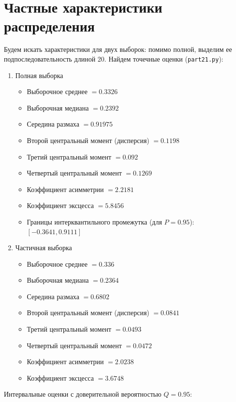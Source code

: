 \documentclass[a4paper,12pt]{article}
\begin{document}
    \section{Частные характеристики распределения}
    Будем искать характеристики для двух выборок: помимо полной, выделим
    ее подпоследовательность длиной 20. Найдем точечные оценки (\texttt{part21.py}):
    \begin{enumerate}
        \item Полная выборка
        \begin{itemize}
            \item Выборочное среднее $= 0.3326$
            \item Выборочная медиана $= 0.2392$
            \item Середина размаха $= 0.91975$
            \item Второй центральный момент (дисперсия) $= 0.1198$
            \item Третий центральный момент $= 0.092$
            \item Четвертый центральный момент $= 0.1269$
            \item Коэффициент асимметрии $=2.2181$
            \item Коэффициент эксцесса $= 5.8456$
            \item Границы интерквантильного промежутка (для $P = 0.95$): $[-0.3641, 0.9111]$
        \end{itemize}
        \item Частичная выборка
        \begin{itemize}
            \item Выборочное среднее $= 0.336$
            \item Выборочная медиана $= 0.2364$
            \item Середина размаха $= 0.6802$
            \item Второй центральный момент (дисперсия) $= 0.0841$
            \item Третий центральный момент $= 0.0493$
            \item Четвертый центральный момент $= 0.0472$
            \item Коэффициент асимметрии $=2.0238$
            \item Коэффициент эксцесса $= 3.6748$
        \end{itemize}
    \end{enumerate}
    Интервальные оценки с доверительной вероятностью $Q = 0.95$:
\end{document}
